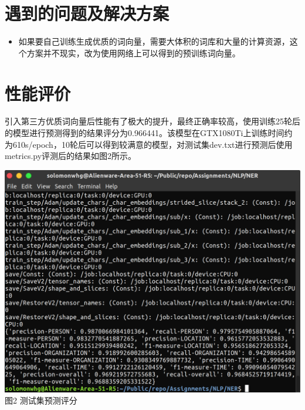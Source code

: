 \documentclass[UTF8]{article}
\begin{document}
 \section{遇到的问题及解决方案}
\begin{itemize}

	\item 如果要自己训练生成优质的词向量，需要大体积的词库和大量的计算资源，这个方案并不现实，改为使用网络上可以得到的预训练词向量。

\end{itemize}
\section{性能评价}

引入第三方优质词向量后性能有了极大的提升，最终正确率较高，使用训练25轮后的模型进行预测得到的结果评分为0.966441。该模型在GTX1080Ti上训练时间约为610s/epoch，10轮后可以得到较满意的模型，对测试集dev.txt进行预测后使用metrics.py评测后的结果如图2所示。
\begin{center}
\includegraphics[scale=0.3]{运行截图.png} \\
	图2 测试集预测评分

\end{center}
\end{document}
